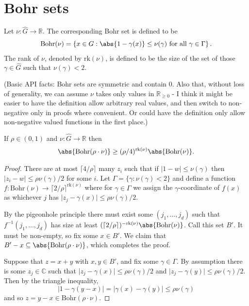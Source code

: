 \chapter{Bohr sets}

\begin{definition}
\label{bohr-set}
\leanok
Let $\nu: \widehat{G} \to \mathbb{R}$. The corresponding Bohr set is defined to be
\[\mathrm{Bohr}(\nu)=\left\{ x\in G : \abs{1-\gamma(x)}\leq \nu(\gamma)\textrm{ for all }\gamma\in\Gamma\right\}.\]
The rank of $\nu$, denoted by $\mathrm{rk}(\nu)$, is defined to be the size of the set of those $\gamma\in\widehat{G}$ such that $\nu(\gamma)<2$.

(Basic API facts: Bohr sets are symmetric and contain $0$. Also that, without loss of generality, we can assume $\nu$ takes only values in $\mathbb{R}_{\geq 0}$ - I think it might be easier to have the definition allow arbitrary real values, and then switch to non-negative only in proofs where convenient. Or could have the definition only allow non-negative valued functions in the first place.)
\end{definition}

\begin{lemma}
  \label{bohr-size}

  If $\rho\in (0,1)$ and $\nu:\widehat{G}\to \mathbb{R}$ then
  \[\abs{\mathrm{Bohr}(\rho\cdot \nu)}\geq (\rho/4)^{\mathrm{rk}(\nu)}\abs{\mathrm{Bohr}(\nu)}.\]
\end{lemma}
\begin{proof}
  There are at most $\lceil 4/\rho\rceil$ many $z_i$ such that if $\lvert 1-w\rvert \leq \nu(\gamma)$ then $\lvert z_i-w\rvert\leq \rho\nu(\gamma)/2$ for some $i$.
  Let $\Gamma=\{ \gamma : \nu(\gamma) <2\}$
  and define a function $f:\mathrm{Bohr}(\nu)\to \lceil 2/\rho\rceil^{\mathrm{rk}(\nu)}$
  where for $\gamma\in \Gamma$ we assign the $\gamma$-coordinate of $f(x)$
  as whichever $j$ has $\lvert z_j-\gamma(x)\rvert \leq \rho\nu(\gamma)/2$.

  By the pigeonhole principle there must exist some $(j_1,\ldots,j_{d})$ such that
  $f^{-1}(j_1,\ldots,j_d)$ has size at least
  $(\lceil 2/\rho\rceil)^{-\mathrm{rk}(\nu)}\abs{\mathrm{Bohr}(\nu)}$. Call this set $B'$.
  It must be non-empty, so fix some $x\in B'$.
  We claim that $B'-x\subseteq \abs{\mathrm{Bohr}(\rho\cdot \nu)}$, which completes the proof.

  Suppose that $z=x+y$ with $x,y\in B'$, and fix some $\gamma\in \Gamma$.
  By assumption there is some $z_j\in \mathbb{C}$ such that
  $\lvert z_j-\gamma(x)\rvert \leq \rho \nu(\gamma)/2$ and
  $\lvert z_j-\gamma(y)\rvert \leq \rho \nu(\gamma)/2$. Then by the triangle inequality,
  \[\lvert 1-\gamma(y-x)\rvert=\lvert \gamma(x)-\gamma(y)\rvert \leq \rho \nu(\gamma)\]
  and so $z=y-x\in \mathrm{Bohr}(\rho\cdot \nu)$.
\end{proof}


